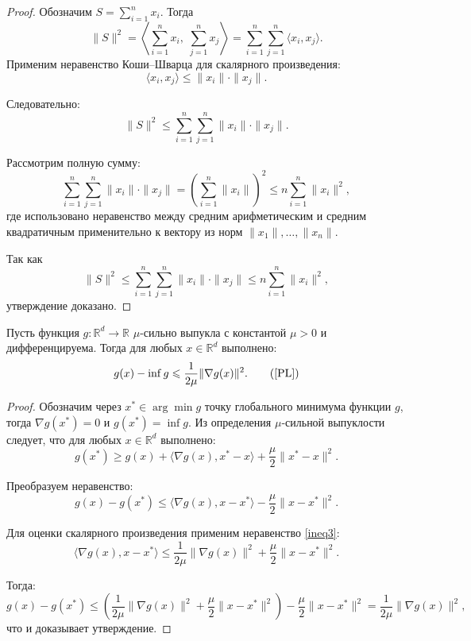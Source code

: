 \begin{proof}
Обозначим \(S = \sum_{i=1}^{n} x_i\). Тогда
\[
\|S\|^2 = \left\langle \sum_{i=1}^{n} x_i,\; \sum_{j=1}^{n} x_j \right\rangle = \sum_{i=1}^{n} \sum_{j=1}^{n} \langle x_i, x_j \rangle.
\]
Применим неравенство Коши–Шварца для скалярного произведения:
\[
\langle x_i, x_j \rangle \leqslant \|x_i\| \cdot \|x_j\|.
\]

Следовательно:
\[
\|S\|^2 \leqslant\sum_{i=1}^{n} \sum_{j=1}^{n} \|x_i\| \cdot \|x_j\|.
\]

Рассмотрим полную сумму:
\[
\sum_{i=1}^{n} \sum_{j=1}^{n} \|x_i\| \cdot \|x_j\| = \left(\sum_{i=1}^{n} \|x_i\|\right)^2 \leqslant n \sum_{i=1}^{n} \|x_i\|^2,
\]
где использовано неравенство между средним арифметическим и средним квадратичным применительно к вектору из норм \(\|x_1\|, \dots, \|x_n\|\).

Так как
\[
\|S\|^2 \leqslant \sum_{i=1}^{n} \sum_{j=1}^{n} \|x_i\| \cdot \|x_j\| \leqslant n \sum_{i=1}^{n} \|x_i\|^2,
\]
утверждение доказано.
\end{proof}


\begin{lemma}\label{lem:pl}
Пусть функция \(g : \mathbb{R}^d \to \mathbb{R}\) \(\mu\)-сильно выпукла с константой \(\mu > 0\) и дифференцируема. Тогда для любых \(x \in \mathbb{R}^d\) выполнено:
\[
g(x) - \inf g \leqslant \frac{1}{2\mu} \|\nabla g(x)\|^2. \tag{\ref{PL}}
\]
\end{lemma}

\begin{proof}
Обозначим через \(x^* \in \arg\min g\) точку глобального минимума функции \(g\), тогда \(\nabla g(x^*) = 0\) и \(g(x^*) = \inf g\). Из определения \(\mu\)-сильной выпуклости следует, что для любых \(x \in \mathbb{R}^d\) выполнено:
\[
g(x^*) \geq g(x) + \langle \nabla g(x), x^* - x \rangle + \frac{\mu}{2} \|x^* - x\|^2.
\]

Преобразуем неравенство:
\[
g(x) - g(x^*) \leq \langle \nabla g(x), x - x^* \rangle - \frac{\mu}{2} \|x - x^*\|^2.
\]

Для оценки скалярного произведения применим неравенство \eqref{ineq3}:
\[
\langle \nabla g(x), x - x^* \rangle  \leq \frac{1}{2\mu} \|\nabla g(x)\|^2 + \frac{\mu}{2} \|x - x^*\|^2.
\]

Тогда:
\[
g(x) - g(x^*) \leq \left( \frac{1}{2\mu} \|\nabla g(x)\|^2 + \frac{\mu}{2} \|x - x^*\|^2 \right) - \frac{\mu}{2} \|x - x^*\|^2 = \frac{1}{2\mu} \|\nabla g(x)\|^2,
\]
что и доказывает утверждение.
\end{proof}


